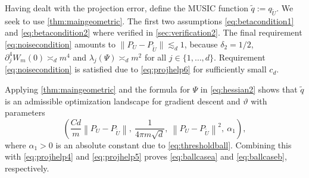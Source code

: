 \documentclass[11pt]{article}
\theoremstyle{definition}
\numberwithin{theorem}{section}
\numberwithin{lemma}{section}
\numberwithin{equation}{section}
\renewcommand{\tilde}{\widetilde}
\newcommand{\norm}[1]{{\left\|#1\right\|}}
\numberwithin{equation}{section}
\begin{document}
        Having dealt with the projection error, define the MUSIC function $\tilde q:=q_{\tilde U}$. We seek to use \cref{thm:maingeometric}. The first two assumptions \cref{eq:betacondition1} and \eqref{eq:betacondition2} where verified in \cref{sec:verification2}. The final requirement \eqref{eq:noisecondition} amounts to $\|P_U-P_{\tilde U}\|\lesssim_d 1$, because $\delta_2=1/2$,  $\partial_j^4 W_m(0)\asymp_d m^4$ and $\lambda_j(\Psi)\asymp_d m^2$ for all $j\in \{1,\dots,d\}$. Requirement \eqref{eq:noisecondition} is satisfied due to \eqref{eq:projhelp6} for sufficiently small $c_d$. 
	
		Applying \cref{thm:maingeometric} and the formula for $\Psi$ in \eqref{eq:hessian2} shows that $\tilde q$ is an admissible optimization landscape for gradient descent and $\vartheta$ with parameters
		$$
		\left( \frac{Cd}{ m} \norm{P_U-P_{\tilde U}}, \
		\frac{1}{4\pi m \sqrt d}, \
		\norm{P_U-P_{\tilde U}}^2, \ \alpha_1 \right),
		$$
		where $\alpha_1>0$ is an absolute constant due to  \eqref{eq:thresholdball}. Combining this with \eqref{eq:projhelp4} and \eqref{eq:projhelp5} proves \eqref{eq:ballcasea} and \eqref{eq:ballcaseb}, respectively. 
	
\end{document}
